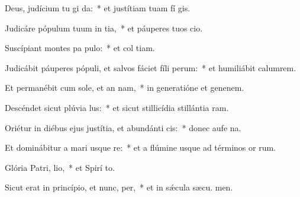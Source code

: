 \item Deus, judícium tu gi da:~* et justítiam tuam fí gis.
\item Judicáre pópulum tuum in tia,~* et páuperes tuos  cio.
\item Suscípiant montes pa pulo:~* et col tiam.
\item Judicábit páuperes pópuli, et salvos fáciet fíli perum:~* et humiliábit calumrem.
\item Et permanébit cum sole, et an nam,~* in generatióne et genenem.
\item Descéndet sicut plúvia  lus:~* et sicut stillicídia stillántia  ram.
\item Oriétur in diébus ejus justítia, et abundánti cis:~* donec aufe na.
\item Et dominábitur a mari usque  re:~* et a flúmine usque ad términos or rum.
\item Glória Patri,  lio,~* et Spirí to.
\item Sicut erat in princípio, et nunc,  per,~* et in sǽcula sæcu. men.
